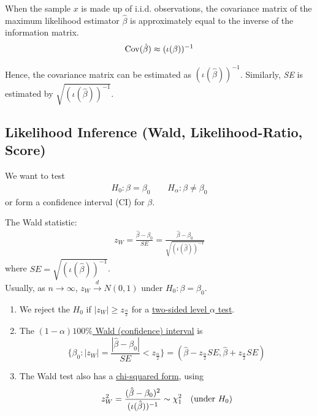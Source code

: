 \documentclass[11pt]{elegantbook}
\begin{document}
\begin{proposition}
    When the sample $x$ is made up of i.i.d. observations, the covariance matrix of the maximum likelihood estimator $\hat{\beta}$ is approximately equal to the inverse of the information matrix. $$\textnormal{Cov}(\hat{\beta})\approx(\iota(\beta))^{-1}$$
\end{proposition}
Hence, the covariance matrix can be estimated as $(\iota(\hat{\beta}))^{-1}$. Similarly, \textit{SE} is estimated by $\sqrt{(\iota(\hat{\beta}))^{-1}}$.

\subsection{Likelihood Inference (Wald, Likelihood-Ratio, Score)}
We want to test
\begin{equation}
    \begin{aligned}
        H_0:\beta=\beta_0\quad\quad H_\alpha:\beta\neq \beta_0
    \end{aligned}
    \nonumber
\end{equation}
or form a confidence interval (CI) for $\beta$.

\begin{definition}
    \normalfont
    The Wald statistic:
    \begin{equation}
        \begin{aligned}
            z_W=\frac{\hat{\beta}-\beta_0}{SE}=\frac{\hat{\beta}-\beta_0}{\sqrt{(\iota(\hat{\beta}))^{-1}}}
        \end{aligned}
        \nonumber
    \end{equation}
    where $\textit{SE}=\sqrt{(\iota(\hat{\beta}))^{-1}}$.\\
    Usually, as $n \rightarrow \infty$, $z_W \stackrel{d}{\longrightarrow} N(0,1)$ under $H_0:\beta=\beta_0$.
    \begin{enumerate}[(1)]
        \item We reject the $H_0$ if $|z_W|\geq z_{\frac{\alpha}{2}}$ for a \underline{two-sided level $\alpha$ test}.
        \item The \underline{$(1-\alpha)100\%$ Wald (confidence) interval} is $$\{\beta_0:|z_W|=\frac{|\hat{\beta}-\beta_0|}{SE}<z_{\frac{\alpha}{2}}\}=(\hat{\beta}-z_\frac{\alpha}{2}SE,\hat{\beta}+z_\frac{\alpha}{2}SE)$$
        \item The Wald test also has a \underline{chi-squared form}, using
        \begin{equation}
            \begin{aligned}
                z_W^2=\frac{(\hat{\beta}-\beta_0)^2}{(\iota(\hat{\beta}))^{-1}}\sim \chi_1^2\quad \textnormal{(under $H_0$)}
            \end{aligned}
            \nonumber
        \end{equation}
    \end{enumerate}
\end{definition}
\end{document}
